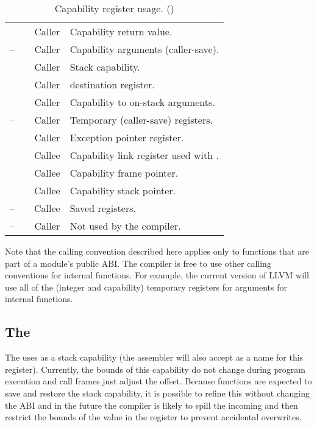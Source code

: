 \begin{table}
\begin{center}
\begin{tabu}{lccX}
			             &                     & Caller & Capability return value. \\
			--  &                     & Caller & Capability arguments (caller-save). \\
			            &            & Caller & Stack capability. \\
			            &                     & Caller &  destination register. \\
			            &                     & Caller & Capability to on-stack arguments. \\
			-- &                     & Caller & Temporary (caller-save) registers.\\
			            &                     & Caller & Exception pointer register. \\
			            &            & Callee & Capability link register used with .\\
			            &            & Callee & Capability frame pointer.\\
			            &            & Callee & Capability stack pointer.\\
			-- &                     & Callee & Saved registers. \\
			-- &                     & Caller & Not used by the compiler.\\
			\bottomrule
		\end{tabu}
		\caption{\label{tbl:purecapreguse}Capability register usage. (\sandboxABI)}
	\end{center}
\end{table}



Note that the calling convention described here applies only to functions that are part of a module's public ABI.
The compiler is free to use other calling conventions for internal functions.
For example, the current version of LLVM will use all of the (integer and
capability) temporary registers for arguments for internal functions.

\subsection{The \sandboxABI{}}

The \sandboxABI{} uses  as a stack capability (the assembler will also accept  as a name for this register).
Currently, the bounds of this capability do not change during program execution and call frames just adjust the offset.
Because functions are expected to save and restore the stack capability, it is possible to refine this without changing the ABI and in the future the compiler is likely to spill the incoming  and then restrict the bounds of the value in the register to prevent accidental overwrites.

